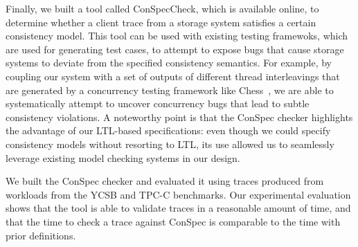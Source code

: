 \documentclass[conference]{IEEEtran}
\begin{document}
	Finally, we built a tool called ConSpecCheck, which is available online, to %
	determine whether a client trace from a storage system satisfies a certain consistency model.
	This tool can be used with existing testing framewoks, which are used for generating test cases, to attempt to expose bugs that cause storage systems to deviate from the specified consistency semantics. For example, by coupling our system with a set of outputs of different thread interleavings that are generated by a concurrency testing framework like Chess~\cite{Musuvathi:2008:SCT:1390841.1390851}, we are able to systematically attempt to uncover concurrency bugs that lead to subtle consistency violations.
	A noteworthy point is that the ConSpec checker highlights the advantage of our LTL-based specifications: even though we could specify consistency models without resorting to LTL, its use allowed us to seamlessly leverage existing model checking systems in our design.
	
	
	We built the ConSpec checker and evaluated it using traces produced from workloads from the YCSB and TPC-C benchmarks. Our experimental evaluation shows that the tool is able to validate traces in a reasonable amount of time, and that the time to check a trace against ConSpec is comparable to the time with prior definitions.
	
\end{document}
